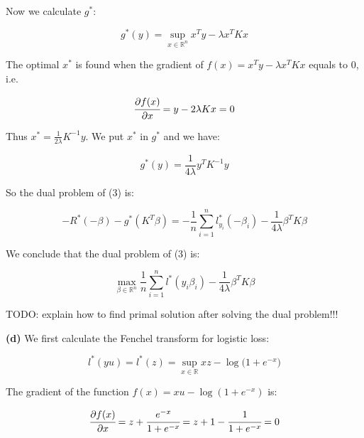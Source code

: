 \documentclass[11pt]{article}
\begin{document}
    Now we calculate $g^*$:

    \vspace{-2em}
    $$
    g^*(y) = \sup_{x \in \mathbb{R}^n} x^T y - \lambda x^T K x
    $$
    \vspace{-2em}

    The optimal $x^*$ is found when the gradient of $f(x) = x^T y - \lambda x^T K x$ equals to 0, i.e.

    \vspace{-2em}
    $$
    \cfrac{ \partial f(x)}{\partial x} = y - 2\lambda Kx = 0
    $$
    \vspace{-2em}

    Thus $x^* = \frac{1}{2\lambda} K^{-1} y$. We put $x^*$ in $g^*$ and we have:

    \vspace{-2em}
    $$
    g^*(y) = \frac{1}{4 \lambda} y^T K^{-1} y
    $$
    \vspace{-2em}

    So the dual problem of (3) is:

    \vspace{-2em}
    $$
    - R^* (-\beta) - g^* (K^T \beta) = - \frac{1}{n} \sum_{i=1}^n l_{y_i}^* (-\beta_i) - \frac{1}{4 \lambda} \beta^T K \beta
    $$
    \vspace{-2em}

    We conclude that the dual problem of (3) is:

    \vspace{-2em}
    $$
    \max_{\beta \in \mathbb{R}^n} \frac{1}{n} \sum_{i=1}^n l^* (y_i \beta_i) - \frac{1}{4 \lambda} \beta^T K \beta
    $$
    \vspace{-2em}

    TODO: explain how to find primal solution after solving the dual problem!!!


    \textbf{(d)} We first calculate the Fenchel transform for logistic loss:

    \vspace{-2em}
    $$
    l^* (yu) = l^* (z) = \sup_{x \in \mathbb{R}} xz - \log \big ( 1 + e^{-x} \big ) 
    $$
    \vspace{-3em}

    The gradient of the function $f(x) = xu - \log (1 + e^{-x})$ is:

    \vspace{-2em}
    $$
    \cfrac{\partial f(x)}{\partial x} = z + \cfrac{e^{-x}}{1 + e^{-x}} = z + 1 - \cfrac{1}{1 + e^{-x}} = 0
    $$
    \vspace{-3em}
\end{document}
